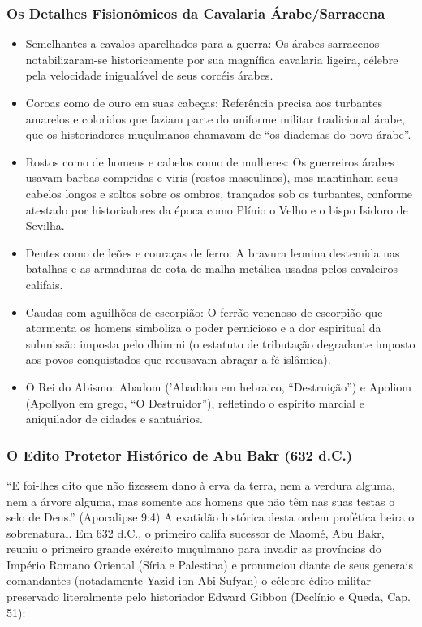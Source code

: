 \documentclass[11pt,a4paper,openany]{book}
\begin{document}
\subsubsection*{Os Detalhes Fisionômicos da Cavalaria Árabe/Sarracena}
\begin{itemize}
  \item Semelhantes a cavalos aparelhados para a guerra: Os árabes sarracenos notabilizaram-se historicamente por sua magnífica cavalaria ligeira, célebre pela velocidade inigualável de seus corcéis árabes.
  \item Coroas como de ouro em suas cabeças: Referência precisa aos turbantes amarelos e coloridos que faziam parte do uniforme militar tradicional árabe, que os historiadores muçulmanos chamavam de ``os diademas do povo árabe''.
  \item Rostos como de homens e cabelos como de mulheres: Os guerreiros árabes usavam barbas compridas e viris (rostos masculinos), mas mantinham seus cabelos longos e soltos sobre os ombros, trançados sob os turbantes, conforme atestado por historiadores da época como Plínio o Velho e o bispo Isidoro de Sevilha.
  \item Dentes como de leões e couraças de ferro: A bravura leonina destemida nas batalhas e as armaduras de cota de malha metálica usadas pelos cavaleiros califais.
  \item Caudas com aguilhões de escorpião: O ferrão venenoso de escorpião que atormenta os homens simboliza o poder pernicioso e a dor espiritual da submissão imposta pelo dhimmi (o estatuto de tributação degradante imposto aos povos conquistados que recusavam abraçar a fé islâmica).
  \item O Rei do Abismo: Abadom ('Abaddon em hebraico, ``Destruição'') e Apoliom (Apollyon em grego, ``O Destruidor''), refletindo o espírito marcial e aniquilador de cidades e santuários.
\end{itemize}



\subsubsection*{O Edito Protetor Histórico de Abu Bakr (632 d.C.)}
``E foi-lhes dito que não fizessem dano à erva da terra, nem a verdura alguma, nem a árvore alguma, mas somente aos homens que não têm nas suas testas o selo de Deus.'' (Apocalipse 9:4)
A exatidão histórica desta ordem profética beira o sobrenatural. Em 632 d.C., o primeiro califa sucessor de Maomé, Abu Bakr, reuniu o primeiro grande exército muçulmano para invadir as províncias do Império Romano Oriental (Síria e Palestina) e pronunciou diante de seus generais comandantes (notadamente Yazid ibn Abi Sufyan) o célebre édito militar preservado literalmente pelo historiador Edward Gibbon (Declínio e Queda, Cap. 51):
\end{document}
